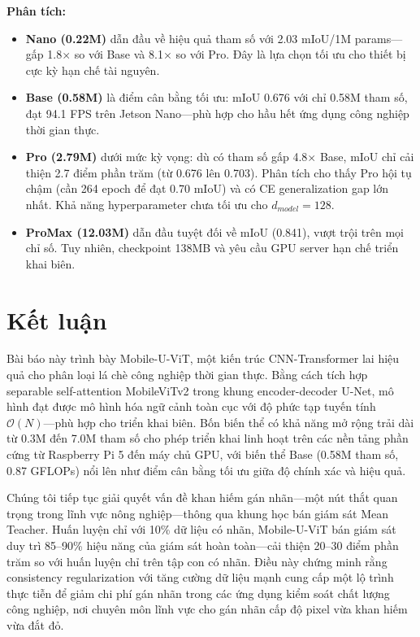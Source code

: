 \documentclass[conference]{IEEEtran}
\begin{document}
\noindent \textbf{Phân tích:}
\begin{itemize}
    \item \textbf{Nano (0.22M)} dẫn đầu về hiệu quả tham số với 2.03 mIoU/1M params---gấp 1.8$\times$ so với Base và 8.1$\times$ so với Pro. Đây là lựa chọn tối ưu cho thiết bị cực kỳ hạn chế tài nguyên.
    \item \textbf{Base (0.58M)} là điểm cân bằng tối ưu: mIoU 0.676 với chỉ 0.58M tham số, đạt 94.1 FPS trên Jetson Nano---phù hợp cho hầu hết ứng dụng công nghiệp thời gian thực.
    \item \textbf{Pro (2.79M)} dưới mức kỳ vọng: dù có tham số gấp 4.8$\times$ Base, mIoU chỉ cải thiện 2.7 điểm phần trăm (từ 0.676 lên 0.703). Phân tích cho thấy Pro hội tụ chậm (cần 264 epoch để đạt 0.70 mIoU) và có CE generalization gap lớn nhất. Khả năng hyperparameter chưa tối ưu cho $d_{model}=128$.
    \item \textbf{ProMax (12.03M)} dẫn đầu tuyệt đối về mIoU (0.841), vượt trội trên mọi chỉ số. Tuy nhiên, checkpoint 138MB và yêu cầu GPU server hạn chế triển khai biên.
\end{itemize}

\FloatBarrier


\section{Kết luận}

Bài báo này trình bày Mobile-U-ViT, một kiến trúc CNN-Transformer lai hiệu quả cho phân loại lá chè công nghiệp thời gian thực. Bằng cách tích hợp separable self-attention MobileViTv2 trong khung encoder-decoder U-Net, mô hình đạt được mô hình hóa ngữ cảnh toàn cục với độ phức tạp tuyến tính $\mathcal{O}(N)$---phù hợp cho triển khai biên. Bốn biến thể có khả năng mở rộng trải dài từ 0.3M đến 7.0M tham số cho phép triển khai linh hoạt trên các nền tảng phần cứng từ Raspberry Pi 5 đến máy chủ GPU, với biến thể Base (0.58M tham số, 0.87 GFLOPs) nổi lên như điểm cân bằng tối ưu giữa độ chính xác và hiệu quả.

Chúng tôi tiếp tục giải quyết vấn đề khan hiếm gán nhãn---một nút thắt quan trọng trong lĩnh vực nông nghiệp---thông qua khung học bán giám sát Mean Teacher. Huấn luyện chỉ với 10\% dữ liệu có nhãn, Mobile-U-ViT bán giám sát duy trì 85--90\% hiệu năng của giám sát hoàn toàn---cải thiện 20--30 điểm phần trăm so với huấn luyện chỉ trên tập con có nhãn. Điều này chứng minh rằng consistency regularization với tăng cường dữ liệu mạnh cung cấp một lộ trình thực tiễn để giảm chi phí gán nhãn trong các ứng dụng kiểm soát chất lượng công nghiệp, nơi chuyên môn lĩnh vực cho gán nhãn cấp độ pixel vừa khan hiếm vừa đắt đỏ.
\end{document}
